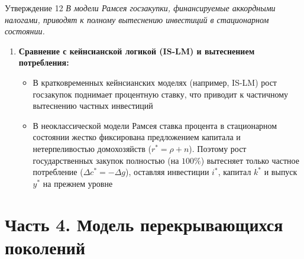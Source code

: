 \documentclass[10pt,a4paper]{article}
\newenvironment{answer}[2]{%
  \begin{qbox}{Утверждение #1}
  \textit{#2}\par\smallskip
}{%
  \end{qbox}\vspace{2pt}
}
\begin{document}
\begin{answer}{12}{В модели Рамсея госзакупки, финансируемые аккордными налогами, приводят к полному вытеснению инвестиций в стационарном состоянии.}
\begin{enumerate}
    \item \textbf{Сравнение с кейнсианской логикой (IS-LM) и вытеснением потребления:}
    \begin{itemize}
        \item В кратковременных кейнсианских моделях (например, IS-LM) рост госзакупок поднимает процентную ставку, что приводит к частичному вытеснению частных инвестиций
        \item В неоклассической модели Рамсея ставка процента в стационарном состоянии жестко фиксирована предложением капитала и нетерпеливостью домохозяйств ($r^* = \rho + n$). Поэтому рост государственных закупок полностью (на $100\%$) вытесняет только частное потребление ($\Delta c^* = -\Delta g$), оставляя инвестиции $i^*$, капитал $k^*$ и выпуск $y^*$ на прежнем уровне
    \end{itemize}
\end{enumerate}
\end{answer}
\newpage

\section{Часть 4. Модель перекрывающихся поколений}
 
\end{document}

